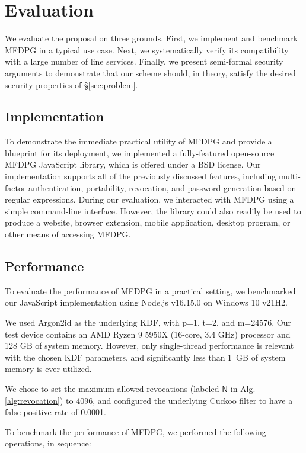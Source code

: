 \section{Evaluation}
\label{sec:evaluation}

We evaluate the proposal on three grounds. First, we implement and benchmark MFDPG in a typical use case. Next, we systematically verify its compatibility with a large number of line services. Finally, we present semi-formal security arguments to demonstrate that our scheme should, in theory, satisfy the desired security properties of \S\ref{sec:problem}.

\subsection{Implementation}

To demonstrate the immediate practical utility of MFDPG and provide a blueprint for its deployment, we implemented a fully-featured open-source MFDPG JavaScript library, which is offered under a BSD license. Our implementation supports all of the previously discussed features, including multi-factor authentication, portability, revocation, and password generation based on regular expressions. During our evaluation, we interacted with MFDPG using a simple command-line interface. However, the library could also readily be used to produce a website, browser extension, mobile application, desktop program, or other means of accessing MFDPG.

\subsection{Performance}
To evaluate the performance of MFDPG in a practical setting, we benchmarked our JavaScript implementation using Node.js v16.15.0 on Windows 10 v21H2.

We used Argon2id as the underlying KDF, with p=1, t=2, and m=24576.
Our test device contains an AMD Ryzen 9 5950X (16-core, 3.4 GHz) processor and 128 GB of system memory.
However, only single-thread performance is relevant with the chosen KDF parameters, and significantly less than 1~GB of system memory is ever utilized.

We chose to set the maximum allowed revocations (labeled $\mathsf{N}$ in Alg. \ref{alg:revocation}) to 4096, and configured the underlying Cuckoo filter to have a false positive rate of 0.0001.

\eject

To benchmark the performance of MFDPG, we performed the following operations, in sequence:

